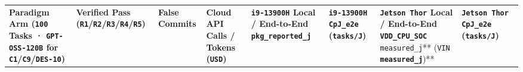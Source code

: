 \documentclass[10pt,letterpaper]{article}
\begin{document}
{\scriptsize\setlength{\tabcolsep}{2.4pt}\renewcommand{\arraystretch}{1.12}
\begin{longtable}[]{@{}
  >{\raggedright\arraybackslash}p{}
  >{\raggedright\arraybackslash}p{}
  >{\raggedleft\arraybackslash}p{}
  >{\raggedleft\arraybackslash}p{}
  >{\raggedleft\arraybackslash}p{}
  >{\raggedleft\arraybackslash}p{}
  >{\raggedleft\arraybackslash}p{}
  >{\raggedleft\arraybackslash}p{}@{}}
\toprule\noalign{}
\begin{minipage}[b]{\linewidth}\raggedright
\textbf{Paradigm Arm (\texttt{100} Tasks · \texttt{GPT-\allowbreak{}OSS-\allowbreak{}120B} for
\texttt{C1}/\allowbreak{}\texttt{C9}/\allowbreak{}\texttt{DES-10})}
\end{minipage} & \begin{minipage}[b]{\linewidth}\raggedright
\textbf{Verified Pass
(\texttt{R1}/\allowbreak{}\texttt{R2}/\allowbreak{}\texttt{R3}/\allowbreak{}\texttt{R4}/\allowbreak{}\texttt{R5})}
\end{minipage} & \begin{minipage}[b]{\linewidth}\raggedleft
\textbf{False Commits}
\end{minipage} & \begin{minipage}[b]{\linewidth}\raggedleft
\textbf{Cloud API Calls / Tokens (\texttt{USD})}
\end{minipage} & \begin{minipage}[b]{\linewidth}\raggedleft
\textbf{\texttt{i9-13900H} Local / End-to-End \texttt{pkg\_\allowbreak{}reported\_\allowbreak{}j}}
\end{minipage} & \begin{minipage}[b]{\linewidth}\raggedleft
\textbf{\texttt{i9-13900H} \texttt{CpJ\_e2e} (\texttt{tasks/J})}
\end{minipage} & \begin{minipage}[b]{\linewidth}\raggedleft
\textbf{\texttt{Jetson\ Thor} Local / End-to-End \texttt{VDD\_\allowbreak{}CPU\_\allowbreak{}SOC}
}\texttt{measured\_\allowbreak{}j}** (\texttt{VIN} \textbf{\texttt{measured\_\allowbreak{}j}})**
\end{minipage} & \begin{minipage}[b]{\linewidth}\raggedleft
\textbf{\texttt{Jetson\ Thor} \texttt{CpJ\_e2e} (\texttt{tasks/J})}

\end{minipage}
\end{longtable}}
\end{document}

